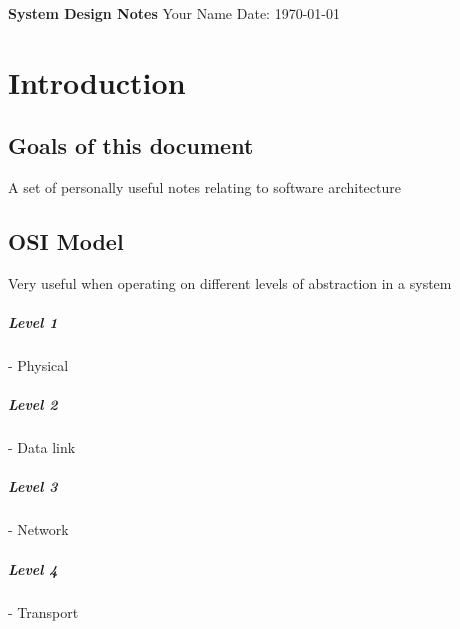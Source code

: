 \documentclass[a4paper, 11pt]{book}
\begin{document}
    \begin{titlepage}
        \centering
        \vspace*{2in}
        \Huge \textbf{System Design Notes}
        \vfill
        \Large Your Name
        \vfill
        \Large Date: \today
    \end{titlepage}

    \newpage

    \tableofcontents

    \newpage

    \listoffigures

    \newpage

    \lstlistoflistings

    \newpage



    \chapter{Introduction}


    \section{Goals of this document}
    A set of personally useful notes relating to software architecture


    \section{OSI Model}
    Very useful when operating on different levels of abstraction in a system

    \paragraph{Level 1} - Physical

    \paragraph{Level 2} - Data link

    \paragraph{Level 3} - Network

    \paragraph{Level 4} - Transport
\end{document}

